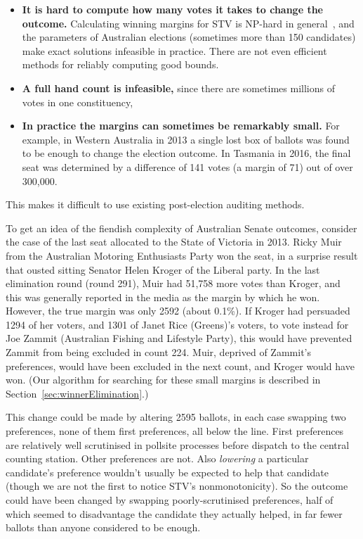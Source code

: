 \documentclass[10pt,a4paper]{article}
\newcommand{\shortVersion}[1]{}
\newcommand{\longVersion}[1]{#1}
\newcommand{\shortVersion}[1]{#1}
\newcommand{\longVersion}[1]{}
\begin{document}
\begin{itemize}
	\item {\bf It is hard to compute how many votes it takes to change the outcome.}  Calculating winning margins for STV is NP-hard in general~\cite{Xia2012}, and the parameters of Australian elections (sometimes more than 150 candidates) make exact solutions infeasible in practice.  There are not even efficient methods for reliably computing good bounds. 	
	\item {\bf A full hand count is infeasible,} since there are sometimes millions of votes in one constituency, 
	\item {\bf In practice the margins can sometimes be remarkably small.}  For example, in Western Australia in 2013 a single lost box of ballots was found to be enough to change the election outcome.  In Tasmania in 2016, the final seat was determined by a difference of 141 votes 
	(a margin of 71) out of over 300,000.	
\end{itemize}

This makes it difficult to use existing post-election auditing methods.   


To get an idea of the fiendish complexity of Australian Senate outcomes, consider the case of the last seat allocated to the State of Victoria in 2013.  Ricky Muir from the Australian Motoring Enthusiasts Party won the seat, in a surprise result that ousted sitting Senator 
Helen Kroger of the Liberal party.  In the last elimination round (round 291), Muir had 51,758 more votes than Kroger, and this was generally reported in the media as the margin by which he won.  However, the true margin was only 2592 (about 0.1\%).  
If Kroger had persuaded 1294 of her voters, and 1301 of Janet Rice (Greens)’s voters, to  vote instead for Joe Zammit (Australian Fishing and Lifestyle Party), this would have prevented Zammit from being excluded in count 224. Muir, deprived of Zammit's preferences, would have been excluded in the next count, and Kroger would have won.   (Our algorithm for searching for these small margins is described in \longVersion{Section~\ref{sec:winnerElimination}.)}
\shortVersion{the full version of this paper.)}


This change could be made by altering 2595 ballots, in each case swapping two preferences, none of them first preferences, all below the line.  First preferences are relatively well scrutinised in pollsite processes before dispatch to the central counting station.  Other preferences are not.   Also \emph{lowering} a particular candidate's preference wouldn't usually be expected to help that candidate (though we are not the first to notice STV's nonmonotonicity).  So the outcome could have been changed by swapping poorly-scrutinised preferences, half of which seemed to disadvantage the candidate they actually helped, in far fewer ballots than anyone considered to be enough.  
\end{document}
